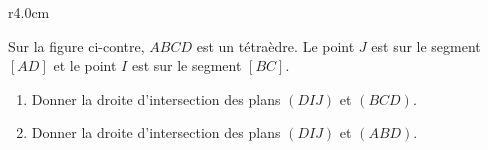 
\begin{exercice}\label{exosmath-0567}

\begin{wrapfigure}{r}{4.0cm}
   \vspace{-1cm}        %
   \centering
   
\end{wrapfigure}

Sur la figure ci-contre, \( ABCD\) est un tétraèdre. Le point \( J\) est sur le segment \( [AD]\) et le point \( I\) est sur le segment \( [BC]\).
\begin{enumerate}
    \item
        Donner la droite d'intersection des plans \( (DIJ)\) et \( (BCD)\).
    \item
        Donner la droite d'intersection des plans \( (DIJ)\) et \( (ABD)\).
\end{enumerate}

\end{exercice}
